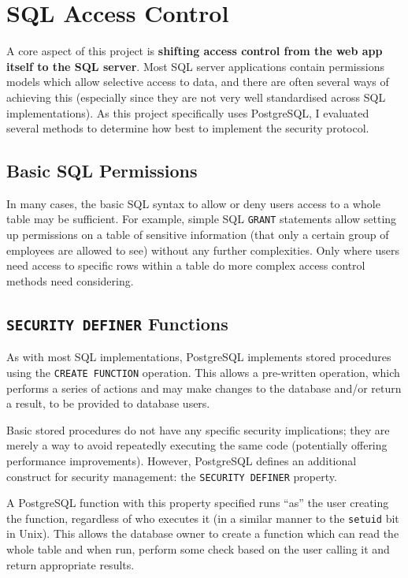\documentclass[12pt]{report}
\begin{document}
\section{SQL Access Control}
\label{sec:sql_access_control}
A core aspect of this project is \textbf{shifting access control from the web app itself to the SQL server}. Most SQL server applications contain permissions models which allow selective access to data, and there are often several ways of achieving this (especially since they are not very well standardised across SQL implementations). As this project specifically uses PostgreSQL, I evaluated several methods to determine how best to implement the security protocol.

\subsection{Basic SQL Permissions}
In many cases, the basic SQL syntax to allow or deny users access to a whole table may be sufficient. For example, simple SQL \texttt{GRANT} statements allow setting up permissions on a table of sensitive information (that only a certain group of employees are allowed to see) without any further complexities. Only where users need access to specific rows within a table do more complex access control methods need considering.

\subsection{\texttt{SECURITY DEFINER} Functions}
As with most SQL implementations, PostgreSQL implements stored procedures using the \texttt{CREATE FUNCTION} operation. This allows a pre-written operation, which performs a series of actions and may make changes to the database and/or return a result, to be provided to database users.

Basic stored procedures do not have any specific security implications; they are merely a way to avoid repeatedly executing the same code (potentially offering performance improvements). However, PostgreSQL defines an additional construct for security management: the \texttt{SECURITY DEFINER} property.

A PostgreSQL function with this property specified runs ``as'' the user creating the function, regardless of who executes it\cite{postgres-SEC_DEF} (in a similar manner to the \texttt{setuid} bit in Unix). This allows the database owner to create a function which can read the whole table and when run, perform some check based on the user calling it and return appropriate results.
\end{document}
